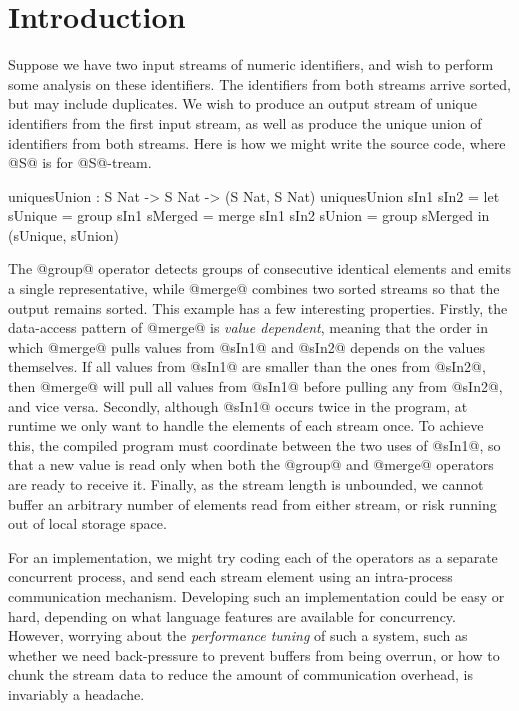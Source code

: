 \section{Introduction}
\label{s:Introduction}

Suppose we have two input streams of numeric identifiers, and wish to perform some analysis on these identifiers. The identifiers from both streams arrive sorted, but may include duplicates. We wish to produce an output stream of unique identifiers from the first input stream, as well as produce the unique union of identifiers from both streams. Here is how we might write the source code, where @S@ is for @S@-tream.
\begin{code}
  uniquesUnion : S Nat -> S Nat -> (S Nat, S Nat)
  uniquesUnion sIn1 sIn2
   = let  sUnique = group sIn1
          sMerged = merge sIn1 sIn2
          sUnion  = group sMerged
     in   (sUnique, sUnion)
\end{code}

The @group@ operator detects groups of consecutive identical elements and emits a single representative, while @merge@ combines two sorted streams so that the output remains sorted. This example has a few interesting properties. Firstly, the data-access pattern of @merge@ is \emph{value dependent}, meaning that the order in which @merge@ pulls values from @sIn1@ and @sIn2@ depends on the values themselves. If all values from @sIn1@ are smaller than the ones from @sIn2@, then @merge@ will pull all values from @sIn1@ before pulling any from @sIn2@, and vice versa. Secondly, although @sIn1@ occurs twice in the program, at runtime we only want to handle the elements of each stream once. To achieve this, the compiled program must coordinate between the two uses of @sIn1@, so that a new value is read only when both the @group@ and @merge@ operators are ready to receive it. Finally, as the stream length is unbounded, we cannot buffer an arbitrary number of elements read from either stream, or risk running out of local storage space.

For an implementation, we might try coding each of the operators as a separate concurrent process, and send each stream element using an intra-process communication mechanism. Developing such an implementation could be easy or hard, depending on what language features are available for concurrency. However, worrying about the \emph{performance tuning} of such a system, such as whether we need back-pressure to prevent buffers from being overrun, or how to chunk the stream data to reduce the amount of communication overhead, is invariably a headache. 

